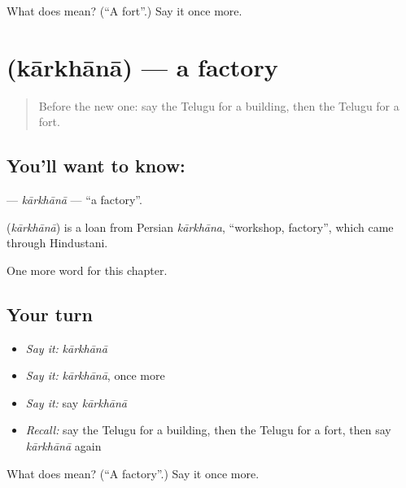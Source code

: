\begin{tcolorbox}[breakable,colback=teal!4,colframe=teal!35!black,title={Before you move on}]
What does  mean? (\textquotedblleft{}A fort\textquotedblright{}.) Say it once more.
\end{tcolorbox}
\section[\texorpdfstring{\te{కార్ఖానా} (kārkhānā)}{కార్ఖానా (kārkhānā)}]{ (kārkhānā) — a factory}

\label{lesson:TE-C292-karkhana}



\begin{quote}
Before the new one: say the Telugu for a building, then the Telugu for a fort.
\end{quote}

\subsection*{You'll want to know: }
\textbf{} — \emph{kārkhānā} — \textquotedblleft{}a factory\textquotedblright{}.

\begin{cousinweb}
\textbf{} (\emph{kārkhānā}) is a loan from Persian \emph{kārkhāna}, \textquotedblleft{}workshop, factory\textquotedblright{}, which came through Hindustani.
\end{cousinweb}

\begin{grammarlens}[title={What you've built}]
One more word for this chapter.
\end{grammarlens}

\subsection*{Your turn}
\begin{itemize}
\raggedright
  \item \emph{Say it:} \emph{kārkhānā}
  \item \emph{Say it:} \emph{kārkhānā}, once more
  \item \emph{Say it:} say \emph{kārkhānā}
  \item \emph{Recall:} say the Telugu for a building, then the Telugu for a fort, then say \emph{kārkhānā} again
\end{itemize}

\begin{tcolorbox}[breakable,colback=teal!4,colframe=teal!35!black,title={Before you move on}]
What does  mean? (\textquotedblleft{}A factory\textquotedblright{}.) Say it once more.
\end{tcolorbox}
